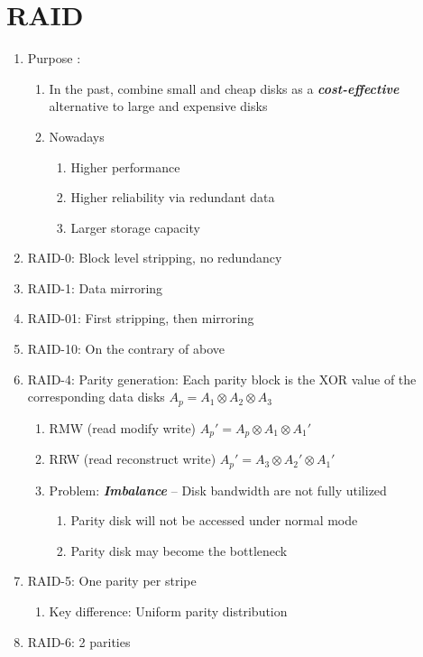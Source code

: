 \documentclass[]{report}
\renewcommand{\emph}[1]{\textbf{\textit{#1}}}
\begin{document}
		\section{RAID}
		\begin{enumerate}
			\item Purpose :
			\begin{enumerate}
				\item In the past, combine small and cheap disks as a \emph{cost-effective} alternative to large and expensive disks
				\item  Nowadays
				\begin{enumerate}
					\item Higher performance
					\item Higher reliability via redundant data
					\item Larger storage capacity
				\end{enumerate}
			\end{enumerate}
			\item RAID-0: Block level stripping, no redundancy
			\item RAID-1: Data mirroring
			\item RAID-01: First stripping, then mirroring
			\item RAID-10: On the contrary of above
			\item RAID-4: Parity generation: Each parity block is the XOR value of the corresponding data disks $A_p=A_1\otimes A_2\otimes A_3$
			\begin{enumerate}
				\item RMW (read modify write) $A_p'=A_p\otimes A_1\otimes A_1'$
				\item RRW (read reconstruct write) $A_p'=A_3\otimes A_2'\otimes A_1'$
				\item Problem: \emph{Imbalance} -- Disk bandwidth are not fully utilized
				\begin{enumerate}
					\item Parity disk will not be accessed under normal mode
					\item Parity disk may become the bottleneck
				\end{enumerate}
			\end{enumerate}
			\item RAID-5: One parity per stripe
			\begin{enumerate}
				\item Key difference: Uniform parity distribution
			\end{enumerate}
			\item RAID-6: 2 parities
		\end{enumerate}
\end{document}
